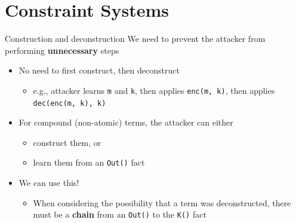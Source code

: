 \documentclass[11pt,aspectratio=169]{beamer}
\begin{document}

\section{Constraint Systems}


\begin{frame}[fragile]{Construction and deconstruction}
    We need to prevent the attacker from performing \textbf{unnecessary} steps
    \begin{itemize}
        \item No need to first construct, then deconstruct
        \begin{itemize}
            \item e.g., attacker learns \texttt{m} and \texttt{k}, then applies 
                  \texttt{enc(m, k)}, then applies \texttt{dec(enc(m, k), k)}
        \end{itemize}
        \item For compound (non-atomic) terms, the attacker can either
        \begin{itemize}
            \item construct them, or
            \item learn them from an \texttt{Out()} fact
        \end{itemize}
        \item We can use this!
        \begin{itemize}
            \item When considering the possibility that a term was
                  deconstructed, there must be a \textbf{chain} from an 
                  \texttt{Out()} to the \texttt{K()} fact
        \end{itemize}
    \end{itemize}
\end{frame}
\end{document}
